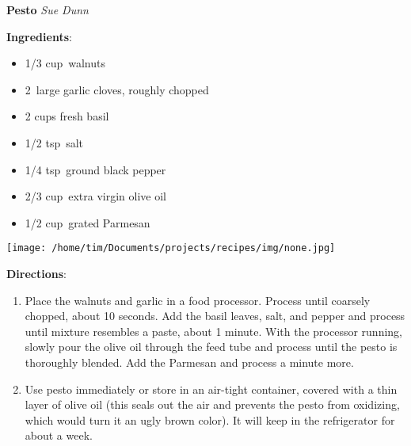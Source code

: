 \documentclass[11pt, twoside, openany]{book}
\begin{document}
\noindent\begin{minipage}[t]{\linewidth}%
{\Large\textbf{Pesto}} \label{pesto}\hfill\textit{Sue Dunn}\\
\noindent\begin{minipage}[t]{0.78\linewidth}%
\textbf{Ingredients}:\vspace{-3mm}
\begin{multicols}{2}
\begin{itemize}\setlength\itemsep{-1mm}
\item 1/3 cup walnuts
\item 2 large garlic cloves, roughly chopped
\item 2 cups fresh basil
\item 1/2 tsp salt
\item 1/4 tsp ground black pepper
\item 2/3 cup extra virgin olive oil
\item 1/2 cup grated Parmesan
\end{itemize}
\end{multicols}
\end{minipage}
\noindent\begin{minipage}[t]{0.18\linewidth}
\centering \strut\vspace*{-\baselineskip}\newline
\texttt{[image: /home/tim/Documents/projects/recipes/img/none.jpg]}\\
\end{minipage}\vspace{3mm}
\textbf{Directions}:
\vspace{-3mm}\begin{enumerate}\setlength\itemsep{-1mm}
\item Place the walnuts and garlic in a food processor. Process until coarsely chopped, about 10 seconds. Add the basil leaves, salt, and pepper and process until mixture resembles a paste, about 1 minute. With the processor running, slowly pour the olive oil through the feed tube and process until the pesto is thoroughly blended. Add the Parmesan and process a minute more.
\item Use pesto immediately or store in an air-tight container, covered with a thin layer of olive oil (this seals out the air and prevents the pesto from oxidizing, which would turn it an ugly brown color). It will keep in the refrigerator for about a week.
\end{enumerate}
\end{minipage}\vspace{8mm}
\end{document}
